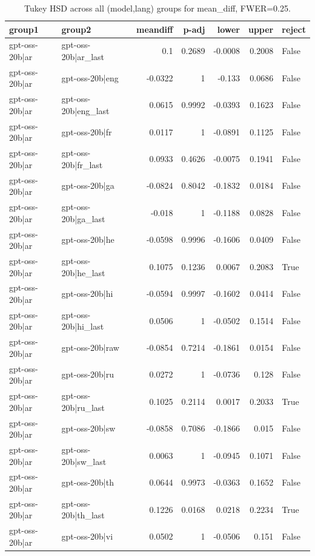 \begin{table}
\caption{Tukey HSD across all (model,lang) groups for mean_diff, FWER=0.25.}
\label{tab:tukey_all_models_all_langs_mean_diff}
\begin{tabular}{l l r r r r l}
\toprule
group1 & group2 & meandiff & p-adj & lower & upper & reject \\
\midrule
gpt-oss-20b|ar & gpt-oss-20b|ar_last & 0.1 & 0.2689 & -0.0008 & 0.2008 & False \\
gpt-oss-20b|ar & gpt-oss-20b|eng & -0.0322 & 1 & -0.133 & 0.0686 & False \\
gpt-oss-20b|ar & gpt-oss-20b|eng_last & 0.0615 & 0.9992 & -0.0393 & 0.1623 & False \\
gpt-oss-20b|ar & gpt-oss-20b|fr & 0.0117 & 1 & -0.0891 & 0.1125 & False \\
gpt-oss-20b|ar & gpt-oss-20b|fr_last & 0.0933 & 0.4626 & -0.0075 & 0.1941 & False \\
gpt-oss-20b|ar & gpt-oss-20b|ga & -0.0824 & 0.8042 & -0.1832 & 0.0184 & False \\
gpt-oss-20b|ar & gpt-oss-20b|ga_last & -0.018 & 1 & -0.1188 & 0.0828 & False \\
gpt-oss-20b|ar & gpt-oss-20b|he & -0.0598 & 0.9996 & -0.1606 & 0.0409 & False \\
gpt-oss-20b|ar & gpt-oss-20b|he_last & 0.1075 & 0.1236 & 0.0067 & 0.2083 & True \\
gpt-oss-20b|ar & gpt-oss-20b|hi & -0.0594 & 0.9997 & -0.1602 & 0.0414 & False \\
gpt-oss-20b|ar & gpt-oss-20b|hi_last & 0.0506 & 1 & -0.0502 & 0.1514 & False \\
gpt-oss-20b|ar & gpt-oss-20b|raw & -0.0854 & 0.7214 & -0.1861 & 0.0154 & False \\
gpt-oss-20b|ar & gpt-oss-20b|ru & 0.0272 & 1 & -0.0736 & 0.128 & False \\
gpt-oss-20b|ar & gpt-oss-20b|ru_last & 0.1025 & 0.2114 & 0.0017 & 0.2033 & True \\
gpt-oss-20b|ar & gpt-oss-20b|sw & -0.0858 & 0.7086 & -0.1866 & 0.015 & False \\
gpt-oss-20b|ar & gpt-oss-20b|sw_last & 0.0063 & 1 & -0.0945 & 0.1071 & False \\
gpt-oss-20b|ar & gpt-oss-20b|th & 0.0644 & 0.9973 & -0.0363 & 0.1652 & False \\
gpt-oss-20b|ar & gpt-oss-20b|th_last & 0.1226 & 0.0168 & 0.0218 & 0.2234 & True \\
gpt-oss-20b|ar & gpt-oss-20b|vi & 0.0502 & 1 & -0.0506 & 0.151 & False \\

\end{tabular}
\end{table}
